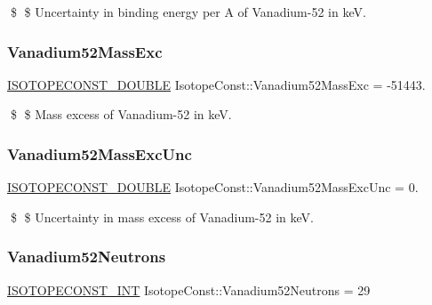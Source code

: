 \$ \$ Uncertainty in binding energy per A of Vanadium-\/52 in keV. \mbox{\label{group___isotope_const-_vanadium-_v52_ga317e34e3a7f58ffeb29ca8d3dbeb00c0}} 
\subsubsection{\texorpdfstring{Vanadium52\+Mass\+Exc}{Vanadium52MassExc}}
{\footnotesize\ttfamily \mbox{\hyperlink{group___isotope_const-_macros_ga8f45a7272ce02c0b4c65c44636ed719a}{I\+S\+O\+T\+O\+P\+E\+C\+O\+N\+S\+T\+\_\+\+D\+O\+U\+B\+LE}} Isotope\+Const\+::\+Vanadium52\+Mass\+Exc = -\/51443.}

\$ \$ Mass excess of Vanadium-\/52 in keV. \mbox{\label{group___isotope_const-_vanadium-_v52_ga9e595c50c8e59078bf4c09b896ab84cf}} 
\subsubsection{\texorpdfstring{Vanadium52\+Mass\+Exc\+Unc}{Vanadium52MassExcUnc}}
{\footnotesize\ttfamily \mbox{\hyperlink{group___isotope_const-_macros_ga8f45a7272ce02c0b4c65c44636ed719a}{I\+S\+O\+T\+O\+P\+E\+C\+O\+N\+S\+T\+\_\+\+D\+O\+U\+B\+LE}} Isotope\+Const\+::\+Vanadium52\+Mass\+Exc\+Unc = 0.}

\$ \$ Uncertainty in mass excess of Vanadium-\/52 in keV. \mbox{\label{group___isotope_const-_vanadium-_v52_ga45a8ef45de24e28185d0b4cbce5d3a97}} 
\subsubsection{\texorpdfstring{Vanadium52\+Neutrons}{Vanadium52Neutrons}}
{\footnotesize\ttfamily \mbox{\hyperlink{group___isotope_const-_macros_ga5f18360b3e99483a35c32d789e62621c}{I\+S\+O\+T\+O\+P\+E\+C\+O\+N\+S\+T\+\_\+\+I\+NT}} Isotope\+Const\+::\+Vanadium52\+Neutrons = 29}

